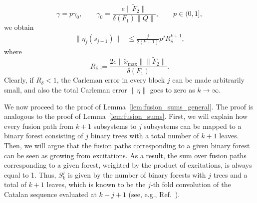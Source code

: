 \documentclass[superscriptaddress,onecolumn,nofootinbib,longbibliography,a4paper,accepted=2026-09-29]{quantumarticle}
\theoremstyle{plain}
\theoremstyle{definition}
\numberwithin{thm}{section}
\numberwithin{assumption}{section}
\numberwithin{lemma}{section}
\numberwithin{prop}{section}
\numberwithin{cor}{section}
\numberwithin{definition}{section}
\numberwithin{rmk}{section}
\numberwithin{equation}{section}
\begin{document}
\begin{equation}
    \gamma = p \gamma_0,\qquad \gamma_0=\frac{e\|\tilde{F}_2\|}{\delta(F_1)\|Q\|},\qquad p\in(0,1],
\end{equation}
we obtain
\begin{align}
    \label{eq:cons_err_final}
    \|\eta_j(s_{j-1})\| &\leq \frac{j}{2(k+1)}p^j R_\delta^{k+1},
\end{align}
where
\begin{equation}
    R_\delta :=\frac{2e\|\tilde{x}_{\mathrm{max}}\|\|\tilde{F}_2\|}{\delta(F_1)}.
\end{equation}
Clearly, if $R_\delta<1$, the Carleman error in every block $j$ can be made arbitrarily small, and also the total Carleman error $\|\eta\|$ goes to zero as $k\to\infty$.

We now proceed to the proof of Lemma~\ref{lem:fusion_sums_general}. The proof is analogous to the proof of Lemma~\ref{lem:fusion_sums}. First, we will explain how every fusion path from $k+1$ subsystems to $j$ subsystems can be mapped to a binary forest consisting of $j$ binary trees with a total number of $k+1$ leaves. Then, we will argue that the fusion paths corresponding to a given binary forest can be seen as growing from excitations. As a result, the sum over fusion paths corresponding to a given forest, weighted by the product of excitations, is always equal to 1. Thus, $S^{j}_k$ is given by the number of binary forests with $j$ trees and a total of $k+1$ leaves, which is known to be the $j$-th fold convolution of the Catalan sequence evaluated at $k-j+1$ (see, e.g., Ref.~\cite{dimitrov2024simple}).
\end{document}
